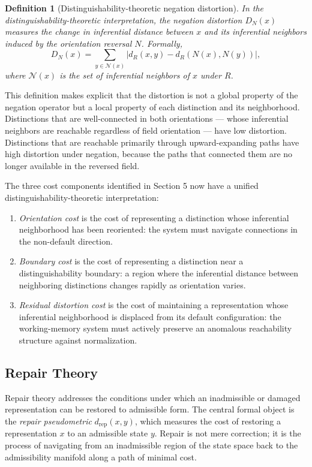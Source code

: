 \documentclass[12pt]{article}
\newtheorem{definition}[theorem]{Definition}
\theoremstyle{remark}
\begin{document}
\begin{definition}[Distinguishability-theoretic negation distortion]
In the distinguishability-theoretic interpretation, the negation
distortion $D_N(x)$ measures the change in inferential distance between
$x$ and its inferential neighbors induced by the orientation reversal
$N$. Formally,
\[
D_N(x) = \sum_{y \in \mathcal{N}(x)} \left| d_R(x, y) - d_R(N(x),
N(y)) \right|,
\]
where $\mathcal{N}(x)$ is the set of inferential neighbors of $x$ under
$R$.
\]
\end{definition}
This definition makes explicit that the distortion is not a global
property of the negation operator but a local property of each
distinction and its neighborhood. Distinctions that are well-connected
in both orientations --- whose inferential neighbors are reachable
regardless of field orientation --- have low distortion. Distinctions
that are reachable primarily through upward-expanding paths have high
distortion under negation, because the paths that connected them are no
longer available in the reversed field.

The three cost components identified in Section 5 now have a unified
distinguishability-theoretic interpretation:

\begin{enumerate}
\item \emph{Orientation cost} is the cost of representing a distinction
whose inferential neighborhood has been reoriented: the system must
navigate connections in the non-default direction.
\item \emph{Boundary cost} is the cost of representing a distinction
near a distinguishability boundary: a region where the inferential
distance between neighboring distinctions changes rapidly as orientation
varies.
\item \emph{Residual distortion cost} is the cost of maintaining a
representation whose inferential neighborhood is displaced from its
default configuration: the working-memory system must actively preserve
an anomalous reachability structure against normalization.
\end{enumerate}

\subsection{Repair Theory}

Repair theory addresses the conditions under which an inadmissible or
damaged representation can be restored to admissible form. The central
formal object is the \emph{repair pseudometric} $d_{\mathrm{rep}}(x, y)$,
which measures the cost of restoring a representation $x$ to an
admissible state $y$. Repair is not mere correction; it is the process
of navigating from an inadmissible region of the state space back to the
admissibility manifold along a path of minimal cost.
\end{document}
